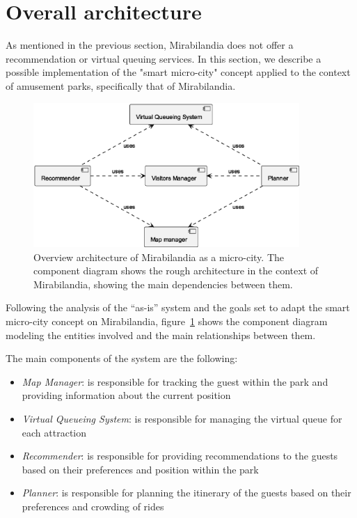 \section{Overall architecture}\label{sec:mira-microcity}

As mentioned in the previous section, Mirabilandia does not offer a recommendation or virtual queuing services.
In this section, we describe a possible implementation of the "smart micro-city" concept applied to the context of amusement parks, specifically that
of Mirabilandia.

\begin{figure}[H]
	\centering
	\includegraphics[width=0.9\textwidth]{img/architecture-overview.eps}
	\caption{Overview architecture of Mirabilandia as a micro-city.
		The component diagram shows the rough architecture in the context of Mirabilandia, showing the main dependencies between them.
	}
	\label{fig:architecture-overview}
\end{figure}

Following the analysis of the ``as-is'' system and the goals set to adapt the smart micro-city concept on Mirabilandia,
figure~\ref{fig:architecture-overview} shows the component diagram modeling the entities involved and the main relationships between them.

The main components of the system are the following:

\begin{itemize}
	\item \textit{Map Manager}: is responsible for tracking the guest within the park and providing information about the current position
	\item \textit{Virtual Queueing System}: is responsible for managing the virtual queue for each attraction
	\item \textit{Recommender}: is responsible for providing recommendations to the guests based on their preferences and position within the park
	\item \textit{Planner}: is responsible for planning the itinerary of the guests based on their preferences and crowding of rides
\end{itemize}

